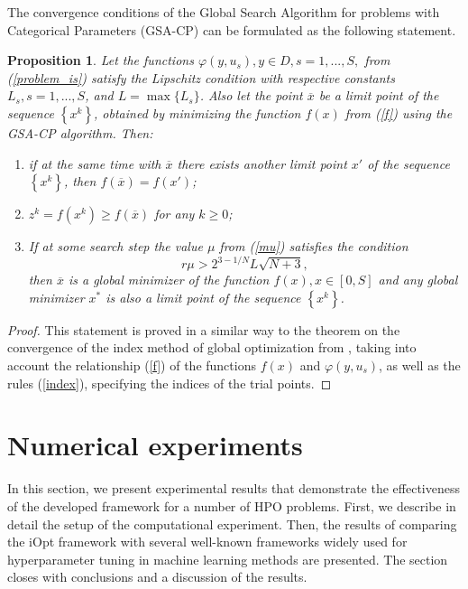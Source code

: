 \documentclass[iicol]{sn-jnl}
\theoremstyle{thmstyleone}%
\newtheorem{proposition}[theorem]{Proposition}%
\theoremstyle{thmstyletwo}%
\theoremstyle{thmstylethree}%
\begin{document}
The convergence conditions of the Global Search Algorithm for problems with Categorical Parameters (GSA-CP) can be formulated as the following statement.
\begin{proposition}
Let the functions $ \varphi(y,u_s), y \in D, s = 1,...,S,$ from (\ref{problem_is}) satisfy the Lipschitz condition with respective constants $L_s, s = 1,...,S$, and $L = \max\{L_s\}$.
Also let the point $\overline{x}$ be a limit point of the sequence $\left\{x^k\right\} $, obtained by minimizing the function $f(x)$ from (\ref{f}) using the GSA-CP algorithm. Then:
\begin{enumerate}
	\item 
	if at the same time with $\overline{x}$ there exists another limit point $x'$ of the sequence $\left\{x^k\right\}$, then $f(\overline{x}) = f(x')$;
	\item
	$z^k=f(x^k) \geq f(\overline{x})$ for any  $k \geq 0$;
	\item
	If at some search step the value $\mu$ from (\ref{mu}) satisfies the condition
\begin{equation}\label{217}
  r \mu > 2^{3-1/N} L \sqrt{N+3},
\end{equation}
then $\overline{x}$ is a global minimizer of the function $f(x), x\in[0,S]$ and any global minimizer $x^\ast$ is also a limit point of the sequence $\left\{x^k\right\}$.
\end{enumerate}
\end{proposition}
\begin{proof}
This statement is proved in a similar way to the theorem on the convergence of the index method of global optimization from \citet{Strongin2000}, taking into account the relationship (\ref{f}) of the functions $f(x)$ and $\varphi(y,u_s)$, as well as the rules (\ref{index}), specifying the indices of the trial points.
\end{proof}

\section{Numerical experiments}\label{sec_exp}
In this section, we present experimental results that demonstrate the effectiveness of the developed framework for a number of HPO problems. First, we describe in detail the setup of the computational experiment. Then, the results of comparing the iOpt framework with several well-known frameworks widely used for hyperparameter tuning in machine learning methods are presented. The section closes with conclusions and a discussion of the results.
\end{document}

